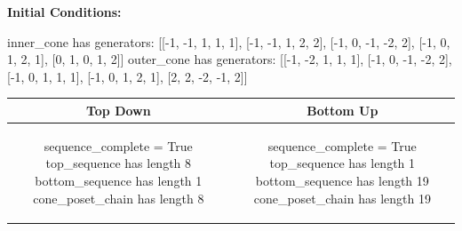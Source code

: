\documentclass[10pt]{article}
\begin{document}
\textbf{Initial Conditions:}
\begin{SAGE}
inner_cone has generators: 
[[-1, -1, 1, 1, 1], [-1, -1, 1, 2, 2], [-1, 0, -1, -2, 2], [-1, 0, 1, 2, 1], [0, 1, 0, 1, 2]]
outer_cone has generators: 
[[-1, -2, 1, 1, 1], [-1, 0, -1, -2, 2], [-1, 0, 1, 1, 1], [-1, 0, 1, 2, 1], [2, 2, -2, -1, 2]]

\end{SAGE}
\begin{tabular}{c|c}
\textbf{Top Down} & \textbf{Bottom Up} \\ \hline  
\begin{SAGE}
sequence_complete = True
top_sequence has length 8
bottom_sequence has length 1
cone_poset_chain has length 8
\end{SAGE} 
&
\begin{SAGE}
sequence_complete = True
top_sequence has length 1
bottom_sequence has length 19
cone_poset_chain has length 19
\end{SAGE} 
\\ \hline


\end{tabular}
\end{document}
